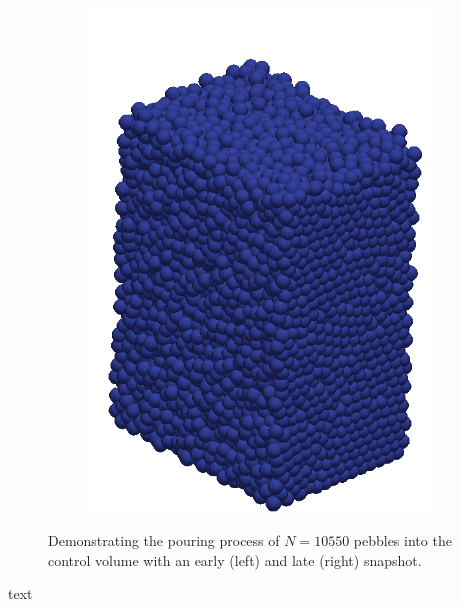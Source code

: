 \begin{figure}[t]
\begin{subfigure}{0.4\textwidth}
		\includegraphics[width=\textwidth]{chapters/figures/fill03.png}
	\end{subfigure}
	\caption{Demonstrating the pouring process of $N = 10550$ pebbles into the control volume with an early (left) and late (right) snapshot.}
\label{fig:fill01}
\end{figure}

text

